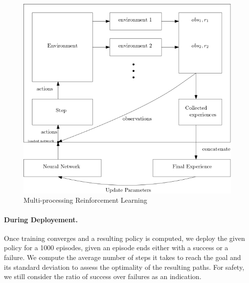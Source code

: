 \begin{figure}[H]
    \centering
    \includegraphics[scale=0.6]{figures/multiprocess.png}
    \caption{Multi-processing Reinforcement Learning}
    \label{fig:multiprocess}
  \end{figure}
  \paragraph{During Deployement.} Once training converges and a resulting policy is computed, we deploy the given policy for a 1000 episodes, given an episode ends either 
  with a success or a failure. We compute the average number of steps it takes to reach the goal and its standard deviation to assess the optimality of the resulting paths. 
  For safety, we still consider the ratio of success over failures as an indication. 
  